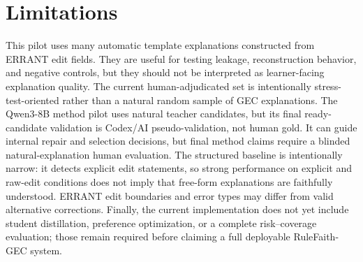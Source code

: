 \section{Limitations}

This pilot uses many automatic template explanations constructed from ERRANT edit fields. They are useful for testing leakage, reconstruction behavior, and negative controls, but they should not be interpreted as learner-facing explanation quality. The current human-adjudicated set is intentionally stress-test-oriented rather than a natural random sample of GEC explanations. The Qwen3-8B method pilot uses natural teacher candidates, but its final ready-candidate validation is Codex/AI pseudo-validation, not human gold. It can guide internal repair and selection decisions, but final method claims require a blinded natural-explanation human evaluation. The structured baseline is intentionally narrow: it detects explicit edit statements, so strong performance on explicit and raw-edit conditions does not imply that free-form explanations are faithfully understood. ERRANT edit boundaries and error types may differ from valid alternative corrections. Finally, the current implementation does not yet include student distillation, preference optimization, or a complete risk--coverage evaluation; those remain required before claiming a full deployable RuleFaith-GEC system.
